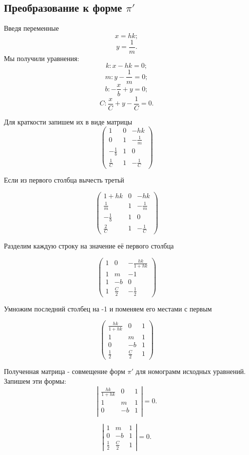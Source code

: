 \subsection{Преобразование к форме $\pi'$}

Введя переменные 
$$x = hk;$$
$$y = \frac{1}{m}.$$
Мы получили уравнения: 
$$k: x - hk = 0;$$
$$m: y - \frac{1}{m} = 0;$$
$$b: -\frac{x}{b} + y = 0;$$
$$C: \frac{x}{C} + y - \frac{1}{C} =0.$$

Для краткости запишем их в виде матрицы
$$
\left(
\begin{array}{ccc}
	1 & 0 & -hk \\
	0 & 1 & -\frac{1}{m} \\
	-\frac{1}{b} & 1 & 0 \\
	\frac{1}{C} & 1 & -\frac{1}{C}
\end{array}
\right)
$$

Если из первого столбца вычесть третьй

$$
\left(
\begin{array}{ccc}
	1+hk & 0 & -hk \\
	\frac{1}{m} & 1 & -\frac{1}{m} \\
	-\frac{1}{b} & 1 & 0 \\
	\frac{2}{C} & 1 & -\frac{1}{C}
\end{array}
\right)
$$

Разделим каждую строку на значение её первого столбца

$$
\left(
\begin{array}{ccc}
	1 & 0 & -\frac{hk}{1+hk} \\
	1 & m & -1 \\
	1 & -b & 0 \\
	1 & \frac{C}{2} & -\frac{1}{2}
\end{array}
\right)
$$

Умножим последний столбец на -1 и поменяем его местами с первым

$$
\left(
\begin{array}{ccc}
	\frac{hk}{1+hk} & 0 & 1 \\
	1 & m & 1 \\
	0 & -b & 1 \\
	\frac{1}{2} & \frac{C}{2} & 1
\end{array}
\right)
$$

Полученная матрица - совмещение форм $\pi'$ для номограмм исходных уравнений.
Запишем эти формы:
$$
\left|
\begin{array}{ccc}
	\frac{hk}{1+hk} & 0 & 1 \\
	1 & m & 1 \\
	0 & -b & 1 \\
\end{array}
\right| = 0.
$$

$$
\left|
\begin{array}{ccc}
	1 & m & 1 \\
	0 & -b & 1 \\
	\frac{1}{2} & \frac{C}{2} & 1
\end{array}
\right| = 0.
$$